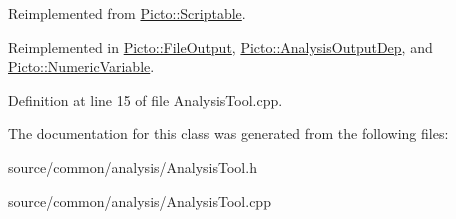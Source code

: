 Reimplemented from \hyperlink{class_picto_1_1_scriptable_a5d36462b3e5c89f0d6ae8fe466c1b060}{Picto\-::\-Scriptable}.



Reimplemented in \hyperlink{class_picto_1_1_file_output_a1bcc204b235bc36066ef69595e390602}{Picto\-::\-File\-Output}, \hyperlink{class_picto_1_1_analysis_output_dep_a1f729ac9a11524ee82e89b2725d2eda2}{Picto\-::\-Analysis\-Output\-Dep}, and \hyperlink{class_picto_1_1_numeric_variable_a58e42e534efa6b84f4e23dead549604d}{Picto\-::\-Numeric\-Variable}.



Definition at line 15 of file Analysis\-Tool.\-cpp.



The documentation for this class was generated from the following files\-:\begin{DoxyCompactItemize}
\item 
source/common/analysis/Analysis\-Tool.\-h\item 
source/common/analysis/Analysis\-Tool.\-cpp\end{DoxyCompactItemize}
